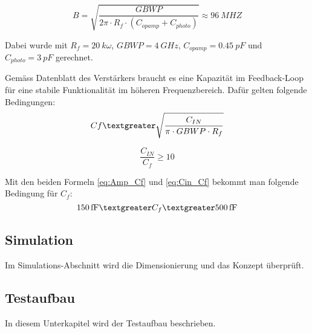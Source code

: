 \begin{equation}\label{eq:Bandwidth2}
B=\sqrt{\frac{GBWP}{2\pi\cdot R_{f}\cdot (C_{opamp}+C_{photo})}}\approx \SI{96}{MHZ}
\end{equation}

Dabei wurde mit $R_{f}=\SI{20}{k\omega}$, $GBWP=\SI{4}{GHz}$, $C_{opamp}=\SI{0.45}{pF}$ und $C_{photo}=\SI{3}{pF}$ gerechnet.

Gemäss Datenblatt des Verstärkers braucht es eine Kapazität im Feedback-Loop für eine stabile Funktionalität im höheren Frequenzbereich. Dafür gelten folgende Bedingungen:
\begin{equation}\label{eq:Amp_Cf}
C{f}\textgreater \sqrt{\frac{C_{IN}}{\pi\cdot GBWP\cdot R_{f}}}
\end{equation}

\begin{equation}\label{eq:Cin_Cf}
\frac{C_{IN}}{C_{f}}\geq 10
\end{equation}

Mit den beiden Formeln \ref{eq:Amp_Cf} und \ref{eq:Cin_Cf} bekommt man folgende Bedingung für $C_{f}$: 
\begin{equation}\label{eq:Cfminmax}
\SI{150}{fF}\textgreater C_{f}\textgreater \SI{500}{fF}
\end{equation}


\subsection{Simulation}
Im Simulations-Abschnitt wird die Dimensionierung und das Konzept überprüft.
\subsection{Testaufbau}
In diesem Unterkapitel wird der Testaufbau beschrieben.